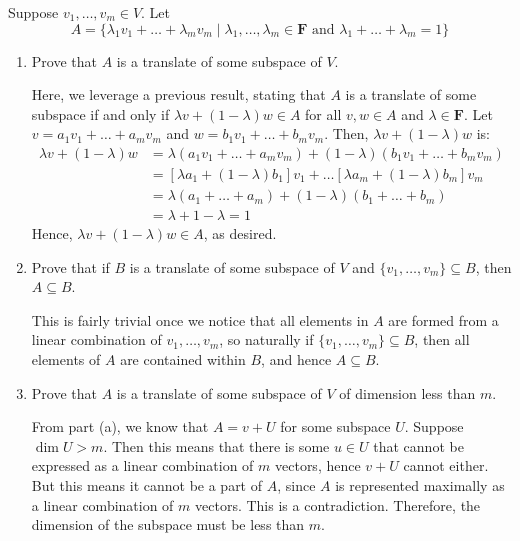 \documentclass[10pt]{article}
\newcommand{\F}{\mathbf F}
\begin{document}
	\begin{problem}
		Suppose \( v_1, \dots, v_m \in V\). Let 
		\[
		A = \{\lambda_1 v_1 + \dots + \lambda_m v_m \mid \lambda_1, \dots, \lambda_m \in \F \text{ and }
		\lambda_1 + \dots + \lambda_m = 1\} 
		\] 
		\begin{enumerate}[label=\alph*)]
			\item Prove that \( A \) is a translate of some subspace of \( V \). 

				\begin{solution}
					Here, we leverage a previous result, stating that \( A \) is a translate of some subspace
					if and only if \( \lambda v + (1 - \lambda) w \in A \) for all \( v, w \in A \) and \(
					\lambda \in \mathbf{F} \). Let \( v = a_1 v_1 + \dots + a_m v_m \) and \( w = b_1 v_1 +
					\dots + b_m v_m \). Then, \( \lambda v + (1 - \lambda)w \) is:
					\begin{align*}
						\lambda v + (1 - \lambda) w &= \lambda(a_1 v_1 + \dots + a_m v_m) + (1 - \lambda)
						(b_1 v_1 + \dots + b_m v_m)  \\ 
													&= [\lambda a_1 + (1 - \lambda) b_1] v_1 + \dots [\lambda
													a_m + (1 - \lambda) b_{m}] v_m\\ 
													&= \lambda( a_1 + \dots + a_m) + (1 - \lambda) (b_1 +
													\dots + b_m) \\
													&= \lambda + 1 - \lambda = 1 
					\end{align*}
					Hence, \( \lambda v + (1 - \lambda) w \in A \), as desired. 
				\end{solution}
			\item Prove that if \( B \) is a translate of some subspace of \( V \) and 
				\( \{v_1, \dots, v_m\}  \subseteq B \), then \( A \subseteq B \). 

				\begin{solution}
					This is fairly trivial once we notice that all elements in \( A \) are formed from a
					linear combination of \( v_1, \dots, v_m \), so naturally if \( \{v_1, \dots, v_m \}
					\subseteq B \), then all elements of \( A \) are contained within \( B \), and hence \( A
					\subseteq B \). 
				\end{solution}
			\item Prove that \( A \) is a translate of some subspace of \( V \) of dimension less than \( m \). 

				\begin{solution}
					From part (a), we know that \( A = v + U \) for some subspace \( U \). Suppose \( \dim U
					> m\). Then this means that there is some \( u \in U \) that cannot be expressed as a
					linear combination of \( m \) vectors, hence \( v + U \) cannot either. But this means it
					cannot be a part of \( A \), since \( A \) is represented maximally as a linear
					combination of \( m \) vectors. This is a contradiction. Therefore, the dimension of the
					subspace must be less than \( m \). 
				\end{solution}
		\end{enumerate}
	\end{problem}
\end{document}
